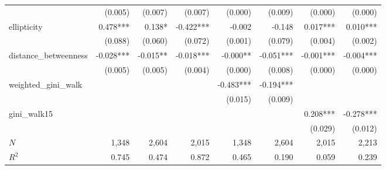 \begin{tabular}{lrrrrrrr}
                      &                      (0.005) &                    (0.007) &                      (0.007) &                      (0.000) &                    (0.009) &                              (0.000) &                              (0.000) \\ 
ellipticity           &                     0.478*** &                     0.138* &                    -0.422*** &                       -0.002 &                     -0.148 &                             0.017*** &                             0.010*** \\ 
                      &                      (0.088) &                    (0.060) &                      (0.072) &                      (0.001) &                    (0.079) &                              (0.004) &                              (0.002) \\ 
distance\_betweenness &                    -0.028*** &                   -0.015** &                    -0.018*** &                     -0.000** &                  -0.051*** &                            -0.001*** &                            -0.004*** \\ 
                      &                      (0.005) &                    (0.005) &                      (0.004) &                      (0.000) &                    (0.008) &                              (0.000) &                              (0.000) \\ 
weighted\_gini\_walk  &                              &                            &                              &                    -0.483*** &                  -0.194*** &                                      &                                      \\ 
                      &                              &                            &                              &                      (0.015) &                    (0.009) &                                      &                                      \\ 
gini\_walk15          &                              &                            &                              &                              &                            &                             0.208*** &                            -0.278*** \\ 
                      &                              &                            &                              &                              &                            &                              (0.029) &                              (0.012) \\ 
\midrule
$N$                   &                        1,348 &                      2,604 &                        2,015 &                        1,348 &                      2,604 &                                2,015 &                                2,213 \\ 
$R^2$                 &                        0.745 &                      0.474 &                        0.872 &                        0.465 &                      0.190 &                                0.059 &                                0.239 \\ 
\bottomrule
\end{tabular}
